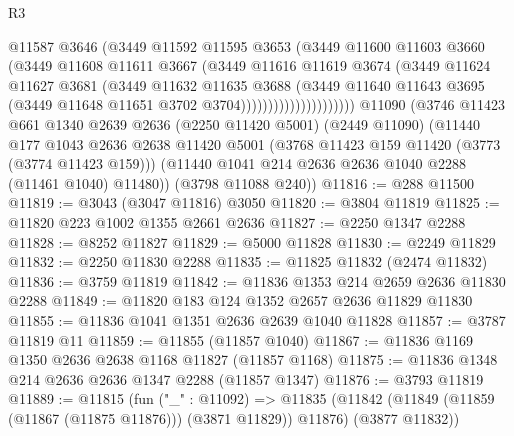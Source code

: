 \begin{lexlean}{R3}
\begin{coremodule}
                              @11587
                              @3646
                              (@3449
                                @11592
                                @11595
                                @3653
                                (@3449
                                  @11600
                                  @11603
                                  @3660
                                  (@3449
                                    @11608
                                    @11611
                                    @3667
                                    (@3449
                                      @11616
                                      @11619
                                      @3674
                                      (@3449
                                        @11624
                                        @11627
                                        @3681
                                        (@3449
                                          @11632
                                          @11635
                                          @3688
                                          (@3449
                                            @11640
                                            @11643
                                            @3695
                                            (@3449 @11648 @11651 @3702 @3704)))))))))))))))))))))
    @11090
    (@3746
      @11423
      @661
      @1340
      @2639
      @2636
      (@2250 @11420 @5001)
      (@2449 @11090)
      (@11440
        @177
        @1043
        @2636
        @2638
        @11420
        @5001
        (@3768 @11423 @159 @11420 (@3773 (@3774 @11423 @159)))
        (@11440 @1041 @214 @2636 @2636 @1040 @2288 (@11461 @1040) @11480))
      (@3798 @11088 @240))
@11816 := @288 @11500
@11819 := @3043 (@3047 @11816) @3050
@11820 := @3804 @11819
@11825 := @11820 @223 @1002 @1355 @2661 @2636
@11827 := @2250 @1347 @2288
@11828 := @8252 @11827
@11829 := @5000 @11828
@11830 := @2249 @11829
@11832 := @2250 @11830 @2288
@11835 := @11825 @11832 (@2474 @11832)
@11836 := @3759 @11819
@11842 := @11836 @1353 @214 @2659 @2636 @11830 @2288
@11849 := @11820 @183 @124 @1352 @2657 @2636 @11829 @11830
@11855 := @11836 @1041 @1351 @2636 @2639 @1040 @11828
@11857 := @3787 @11819 @11
@11859 := @11855 (@11857 @1040)
@11867 := @11836 @1169 @1350 @2636 @2638 @1168 @11827 (@11857 @1168)
@11875 := @11836 @1348 @214 @2636 @2636 @1347 @2288 (@11857 @1347)
@11876 := @3793 @11819
@11889 := @11815
    (fun ("_" : @11092) =>
    @11835 (@11842 (@11849 (@11859 (@11867 (@11875 @11876))) (@3871 @11829)) @11876) (@3877 @11832))

\end{coremodule}
\end{lexlean}
